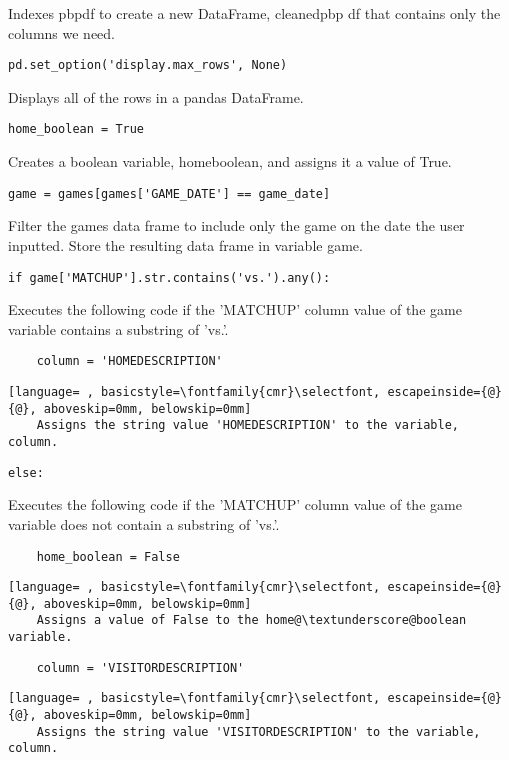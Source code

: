 \documentclass{article}
\begin{document}
Indexes pbp\textunderscore df to create a new DataFrame, cleaned\textunderscore pbp \textunderscore df that contains only the columns we need.
\begin{lstlisting}
pd.set_option('display.max_rows', None)
\end{lstlisting}
Displays all of the rows in a pandas DataFrame.
\begin{lstlisting}
home_boolean = True
\end{lstlisting}
Creates a boolean variable, home\textunderscore boolean, and assigns it a value of True.
\begin{lstlisting}
game = games[games['GAME_DATE'] == game_date]
\end{lstlisting}
Filter the games data frame to include only the game on the date the user inputted. Store the resulting data frame in variable game.
\begin{lstlisting}
if game['MATCHUP'].str.contains('vs.').any():
\end{lstlisting}
Executes the following code if the 'MATCHUP' column value of the game variable contains a substring of 'vs.'.
\begin{lstlisting}
    column = 'HOMEDESCRIPTION'
\end{lstlisting}
\begin{lstlisting}[language= , basicstyle=\fontfamily{cmr}\selectfont, escapeinside={@}{@}, aboveskip=0mm, belowskip=0mm]
    Assigns the string value 'HOMEDESCRIPTION' to the variable, column.
\end{lstlisting}
\begin{lstlisting}
else:
\end{lstlisting}
Executes the following code if the 'MATCHUP' column value of the game variable does not contain a substring of 'vs.'.
\begin{lstlisting}
    home_boolean = False
\end{lstlisting}
\begin{lstlisting}[language= , basicstyle=\fontfamily{cmr}\selectfont, escapeinside={@}{@}, aboveskip=0mm, belowskip=0mm]
    Assigns a value of False to the home@\textunderscore@boolean variable.
\end{lstlisting}
\begin{lstlisting}
    column = 'VISITORDESCRIPTION'
\end{lstlisting}
\begin{lstlisting}[language= , basicstyle=\fontfamily{cmr}\selectfont, escapeinside={@}{@}, aboveskip=0mm, belowskip=0mm]
    Assigns the string value 'VISITORDESCRIPTION' to the variable, column.
\end{lstlisting}
\end{document}
